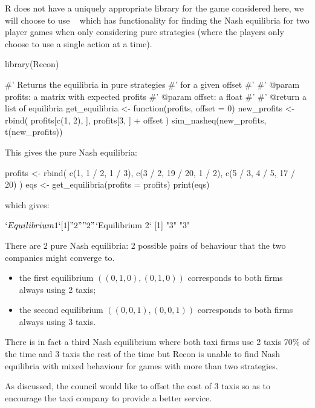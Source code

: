 R does not have a uniquely appropriate library for the game considered here, we
will choose to use ~\cite{oliveira2019recon} which has functionality for finding the
Nash equilibria for two player games when only considering pure strategies
(where the players only choose to use a single action at a time).

\begin{Rin}
library(Recon)

#' Returns the equilibria in pure strategies
#' for a given offset
#'
#' @param profits: a matrix with expected profits
#' @param offset: a float
#'
#' @return a list of equilibria
get_equilibria <- function(profits, offset = 0){
  new_profits <- rbind(
    profits[c(1, 2), ],
    profits[3, ] + offset
  )
  sim_nasheq(new_profits, t(new_profits))
}
\end{Rin}


This gives the pure Nash equilibria:

\begin{Rin}

profits <- rbind(
  c(1, 1 / 2, 1 / 3),
  c(3 / 2, 19 / 20, 1 / 2),
  c(5 / 3, 4 / 5, 17 / 20)
)
eqs <- get_equilibria(profits = profits)
print(eqs)
\end{Rin}

which gives:

\begin{Rout}
$`Equilibrium 1`
[1] "2" "2"

$`Equilibrium 2`
[1] "3" "3"

\end{Rout}

There are 2 pure Nash equilibria: 2 possible pairs of behaviour that the two
companies might converge to.

\begin{itemize}
    \item the first equilibrium \(((0, 1, 0), (0, 1, 0))\) corresponds to both
          firms always using 2 taxis;
    \item the second equilibrium \(((0, 0, 1), (0, 0, 1))\) corresponds to both
          firms always using 3 taxis.
\end{itemize}

There is in fact a third Nash equilibrium where both taxi firms use 2 taxis 70\%
of the time and 3 taxis the rest of the time but Recon is unable
to find Nash equilibria with mixed behaviour for games with more than two
strategies.

As discussed, the council would like to offset the cost of 3
taxis so as to encourage the taxi company to provide a better service.

